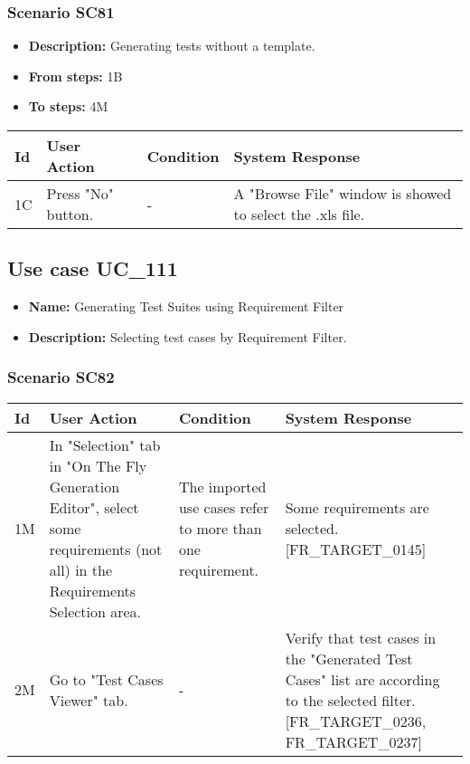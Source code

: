\documentclass[a4paper,11pt]{article}
\newcommand{\bl}{\\ \hline}
\begin{document}
\subsubsection*{Scenario SC81}
\begin{itemize}
\item {\bf Description:} Generating tests without a template.
\item {\bf From steps:} 1B
\item {\bf To steps:} 4M
\end{itemize}
\begin{tabular}{|p{0.4in}|p{1.5in}|p{1.5in}|p{1.5in}|}
\hline
Id & User Action & Condition & System Response \bl 
1C & Press "No" button. & - & A "Browse File" window is showed to select the .xls file.
					\bl
\end{tabular}
\subsection*{Use case UC_111}
\begin{itemize}
\item {\bf Name: }Generating Test Suites using Requirement Filter
\item {\bf Description: }Selecting test cases by Requirement Filter.
			
\end{itemize}
\subsubsection*{Scenario SC82}
\begin{tabular}{|p{0.4in}|p{1.5in}|p{1.5in}|p{1.5in}|}
\hline
Id & User Action & Condition & System Response \bl 
1M & In "Selection" tab in "On The Fly Generation Editor",
						select some requirements (not all) in the Requirements Selection
						area.  & The imported use cases refer to more than one
						requirement. & Some requirements are selected. [FR_TARGET_0145]
					\bl
2M & Go to "Test Cases Viewer" tab. & - &  Verify that test cases in the "Generated Test Cases"
						list are according to the selected filter. [FR_TARGET_0236,
						FR_TARGET_0237]\bl
\end{tabular}
\end{document}
